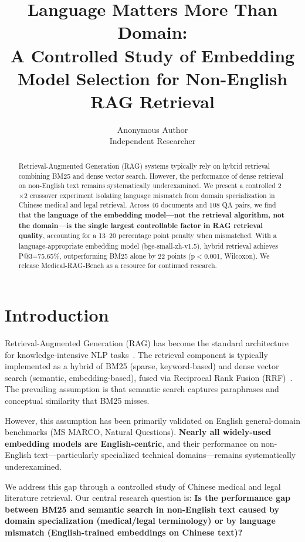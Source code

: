 ﻿\documentclass[11pt,a4paper]{article}
\title{\textbf{Language Matters More Than Domain:\\ A Controlled Study of Embedding Model Selection for Non-English RAG Retrieval}}
\author{Anonymous Author\\Independent Researcher}
\date{}
\begin{document}
\maketitle

\begin{abstract}
Retrieval-Augmented Generation (RAG) systems typically rely on hybrid retrieval combining BM25 and dense vector search. However, the performance of dense retrieval on non-English text remains systematically underexamined. We present a controlled 2$\times$2 crossover experiment isolating language mismatch from domain specialization in Chinese medical and legal retrieval. Across 46 documents and 108 QA pairs, we find that \textbf{the language of the embedding model---not the retrieval algorithm, not the domain---is the single largest controllable factor in RAG retrieval quality}, accounting for a 13--20 percentage point penalty when mismatched. With a language-appropriate embedding model (bge-small-zh-v1.5), hybrid retrieval achieves P@3=75.65\%, outperforming BM25 alone by 22 points (p$<$0.001, Wilcoxon). We release Medical-RAG-Bench as a resource for continued research.
\end{abstract}

\section{Introduction}

Retrieval-Augmented Generation (RAG) has become the standard architecture for knowledge-intensive NLP tasks~\cite{lewis2020rag}. The retrieval component is typically implemented as a hybrid of BM25 (sparse, keyword-based) and dense vector search (semantic, embedding-based), fused via Reciprocal Rank Fusion (RRF)~\cite{cormack2009rrf}. The prevailing assumption is that semantic search captures paraphrases and conceptual similarity that BM25 misses.

However, this assumption has been primarily validated on English general-domain benchmarks (MS MARCO, Natural Questions). \textbf{Nearly all widely-used embedding models are English-centric}, and their performance on non-English text---particularly specialized technical domains---remains systematically underexamined.

We address this gap through a controlled study of Chinese medical and legal literature retrieval. Our central research question is: \textbf{Is the performance gap between BM25 and semantic search in non-English text caused by domain specialization (medical/legal terminology) or by language mismatch (English-trained embeddings on Chinese text)?}
\end{document}
